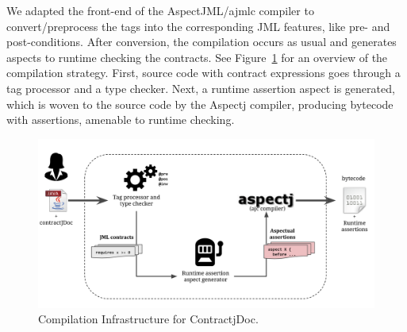 We adapted the front-end of the AspectJML/ajmlc compiler to convert/preprocess the \contractjdoc{} tags into the corresponding JML features, like pre- and post-conditions.
After conversion, the compilation occurs as usual and generates aspects to runtime checking the
contracts. See Figure~\ref{fig:compilerInfra}
for an overview of the compilation strategy.
First, source code with \contractjdoc{}
contract expressions goes through a tag processor and a type checker. Next, a runtime assertion aspect is generated, which is woven to the source code by the Aspectj compiler, producing bytecode with assertions, amenable to runtime checking.


\begin{figure}[h]
\centering
\includegraphics[width=1.0\textwidth]{figs/compilerInfra}
\caption{Compilation Infrastructure for ContractjDoc.}
\label{fig:compilerInfra}
\end{figure}


